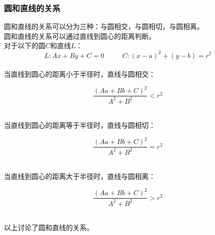 \documentclass[UTF8]{ctexart}
\begin{document}
\subsubsection{圆和直线的关系}
    \setcounter{equation}{0}
    圆和直线的关系可以分为三种：与圆相交，与圆相切，与圆相离。\\[3mm]
    圆和直线的关系可以通过直线到圆心的距离判断。\\[5mm]
    对于以下的圆$C$和直线$L$：
    \begin{equation}
        L:Ax+By+C=0~~~~~~~~~~~~C:(x-a)^2+(y-b)=r^2
    \end{equation}\\
    当直线到圆心的距离小于半径时，直线与圆相交：\vspace{3pt}
    \begin{large}
        \begin{equation*}
            \frac{\left(Aa+Bb+C\right)^2}{A^2+B^2}<r^2
        \end{equation*}
    \end{large}\\
    当直线到圆心的距离等于半径时，直线与圆相切：\vspace{3pt}
    \begin{large}
        \begin{equation*}
            \frac{\left(Aa+Bb+C\right)^2}{A^2+B^2}=r^2
        \end{equation*}
    \end{large}\\
    当直线到圆心的距离大于半径时，直线与圆相离：\vspace{3pt}
    \begin{large}
        \begin{equation*}
            \frac{\left(Aa+Bb+C\right)^2}{A^2+B^2}>r^2
        \end{equation*}
    \end{large}\\
    以上讨论了圆和直线的关系。

\newpage
\end{document}

